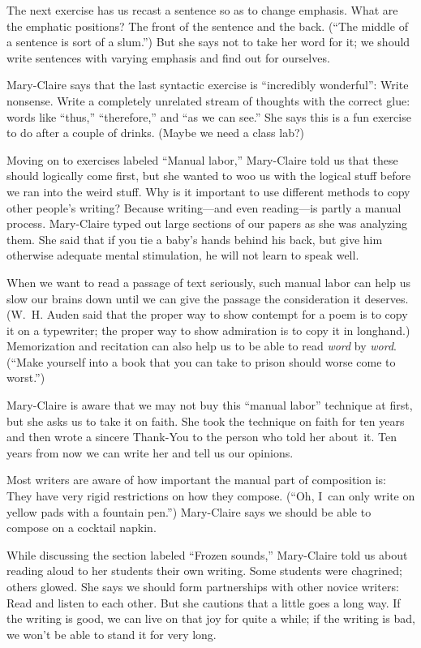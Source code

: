 The next exercise has us recast a sentence so as to change emphasis.  What
are the emphatic positions? The front of the sentence and the back. (``The
middle of a sentence is sort of a slum.'')   But she says not to take her
word for it; we should write sentences with varying emphasis and find out
for ourselves.

Mary-Claire says that the last syntactic exercise is ``incredibly
wonderful'': Write nonsense.  Write a completely unrelated stream of
thoughts with the correct glue: words like ``thus,'' ``therefore,'' and ``as we
can see.''  She says this is a fun exercise to do after a couple of drinks.
(Maybe we need a class lab?)

Moving on to exercises labeled ``Manual labor,'' Mary-Claire told us that
these should logically come first, but she wanted to woo us with the
logical stuff before we ran into the weird stuff.  Why is it important to
use different methods to copy other people's writing? Because writing---and
even reading---is partly a manual process.  Mary-Claire typed out large
sections of our papers as she was analyzing them. She said that if you
tie a baby's hands behind his back, but give him otherwise adequate
mental stimulation, he will not learn to speak well.

When we want to  read a passage of text seriously, such manual labor can
help us slow our brains down until we can give the passage the
consideration it deserves.  (W.~H. Auden said that the proper way to show
contempt for a poem is to copy it on a typewriter;  the proper way to
show admiration is to copy it in longhand.)  Memorization and recitation
can also help us to be able to read {\it word\/} by {\it word}. 
(``Make yourself into
a book that you can take to prison should worse come to worst.'')

Mary-Claire is aware that we may not buy this ``manual labor'' technique at
first, but she asks us to take it on faith. She took the technique on
faith for ten years and then wrote a sincere Thank-You to
the person who told her about~it.
Ten years from now we can write her and tell us our opinions.

Most writers are aware of how important the manual part of composition is:
They have very rigid restrictions on how they compose. (``Oh, I~can only
write on yellow pads with a fountain pen.'')  Mary-Claire
says we should be able to compose on a cocktail napkin.  

While discussing the section labeled ``Frozen sounds,'' Mary-Claire told us
about reading aloud to her students their own writing. Some students were
chagrined; others glowed.  She says we should form partnerships with other
novice writers: Read and listen to each other.  But she cautions  that a
little goes a long way.  If the writing is good, we can live on that joy
for quite a while; if the writing is bad, we won't be able to stand it
for very long.

